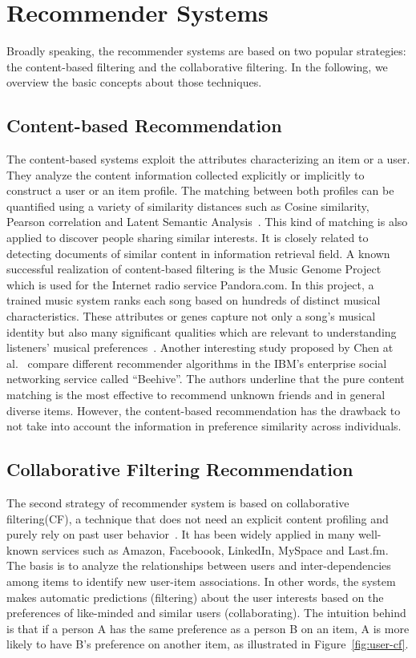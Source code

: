\chapter{Recommender Systems} \label{app:recommendation}
\graphicspath{{appendix/}}
Broadly speaking, the recommender systems are based on two popular strategies: the content-based filtering and the collaborative filtering. In the following, we overview the basic concepts about those techniques. 

\section{Content-based Recommendation}               \label{sec:content-recommendation}
The content-based systems exploit the attributes characterizing an item or a user. They analyze the content information collected explicitly or implicitly to construct a user or an item profile. The matching between both profiles can be quantified using a variety of similarity distances such as Cosine similarity, Pearson correlation and Latent Semantic Analysis~\cite{Deerwester:ASIS90}. This kind of matching is also applied to discover people sharing similar interests. It is closely related to detecting documents of similar content in information retrieval field. A known successful realization of content-based filtering is the Music Genome Project which is used for the Internet radio service Pandora.com. In this project, a trained music system ranks each song  based on hundreds of distinct musical characteristics. These attributes or genes capture not only a song's musical identity but also many significant qualities which are relevant to understanding listeners' musical preferences~\cite{Koren:ICS2009}. Another interesting study proposed by Chen at al.~\cite{Chen:ICHF2009} compare different recommender algorithms in the IBM's enterprise social networking service called ``Beehive''. The authors underline that the pure content matching is the most effective to recommend unknown friends and in general diverse items. However, the  content-based recommendation has the drawback to not take into account the information in preference similarity across individuals.

\section{Collaborative Filtering Recommendation}               \label{sec:collaborative-filtering}
The second strategy of recommender system is based on collaborative filtering(CF), a technique that does not need an explicit content profiling and purely rely on past user behavior~\cite{Herlocker:CSCW00}. It has been widely applied in many well-known services such as Amazon, Faceboook, LinkedIn, MySpace and Last.fm. The basis is to analyze the relationships between users and inter-dependencies among items to identify new user-item associations. In other words, the system makes automatic predictions (filtering) about the user interests based on the preferences of like-minded and similar users (collaborating). The intuition behind is that if a person A has the same preference as a person B on an item, A is more likely to have B's preference on another item, as illustrated in Figure~\ref{fig:user-cf}.

